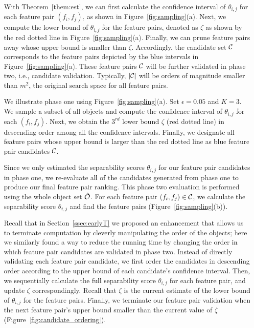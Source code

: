 With Theorem~\ref{them:est}, we can first calculate the confidence interval of $\theta_{i,j}$ for each feature pair $(f_i,f_j)$, as shown in Figure~\ref{fig:sampling}(a). Next, we compute the lower bound of $\theta_{i,j}$ for the \topk feature pairs, denoted as $\zeta$ as shown by the red dotted line in Figure~\ref{fig:sampling}(a). Finally, we can prune feature pairs away whose upper bound is smaller than $\zeta$. Accordingly, the candidate set ${\mathcal{C}}$ corresponds to the feature pairs depicted by the blue intervals in Figure~\ref{fig:sampling}(a). These feature pairs ${\mathcal{C}}$ will be further validated in phase two, i.e., candidate validation. Typically, $|{\mathcal{C}}|$ will be orders of magnitude smaller than $m^2$, the original search space for all feature pairs.

\begin{example}
We illustrate phase one using Figure~\ref{fig:sampling}(a). Set $\epsilon = 0.05$ and $K=3$. We sample a subset of all objects and compute the confidence interval of $\theta_{i,j}$ for each $(f_i,f_j)$. Next, we obtain the $3^{rd}$ lower bound $\zeta$ (red dotted line) in descending order among all the confidence intervals. Finally, we designate all feature pairs whose upper bound is larger than the red dotted line as blue feature pair candidates ${\mathcal{C}}$.
\end{example}

Since we only estimated the separability scores $\theta_{i,j}$ for our feature pair candidates in phase one, we re-evaluate all of the candidates generated from phase one to produce our final feature pair ranking. This phase two evaluation is performed using the whole object set $\hat{{\mathcal{O}}}$.   For each feature pair $(f_i,f_j)\in {\mathcal{C}}$, we calculate the separability score $\theta_{i,j}$ and find the \topk feature pairs (Figure~\ref{fig:sampling}(b)).

 Recall that in Section~\ref{ssec:earlyT} we proposed an enhancement that allows us to terminate computation by cleverly manipulating the order of the objects; here we similarly found a way to reduce the running time by changing the order in which feature pair candidates are validated in phase two. Instead of directly validating each feature pair candidate, we first order the candidates in descending order according to the upper bound of each candidate's confidence interval. Then, we sequentially calculate the full separability score $\theta_{i,j}$ for each feature pair, and update $\zeta$ correspondingly. Recall that $\zeta$ is the current estimate of the lower bound of $\theta_{i,j}$ for the \topk feature pairs. Finally, we terminate our feature pair validation when the next feature pair's upper bound smaller than the current value of $\zeta$ (Figure~\ref{fig:candidate_ordering}).

